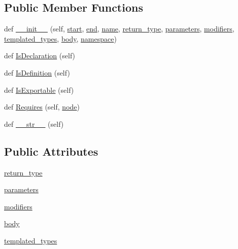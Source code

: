 \subsection*{Public Member Functions}
\begin{DoxyCompactItemize}
\item 
def \hyperlink{classcpp_1_1ast_1_1Function_ab5270f5d353ec5e9dcd136e4cc6c7f6c}{\+\_\+\+\_\+init\+\_\+\+\_\+} (self, \hyperlink{classcpp_1_1ast_1_1Node_a7b2aa97e6a049bb1a93aea48c48f1f44}{start}, \hyperlink{classcpp_1_1ast_1_1Node_a3c5e5246ccf619df28eca02e29d69647}{end}, \hyperlink{classcpp_1_1ast_1_1__GenericDeclaration_af774f4729dfd78d0538a6782fe8514c1}{name}, \hyperlink{classcpp_1_1ast_1_1Function_af750fd788d7ab33163ee066534780212}{return\+\_\+type}, \hyperlink{classcpp_1_1ast_1_1Function_a0e61ef47af9cf2fd4402dbd8cab631ef}{parameters}, \hyperlink{classcpp_1_1ast_1_1Function_ad30eed435f1ff9ff34ade9cc0d7be121}{modifiers}, \hyperlink{classcpp_1_1ast_1_1Function_a57bb03218bade3240137a0d91c467cb6}{templated\+\_\+types}, \hyperlink{classcpp_1_1ast_1_1Function_a8e25e5016b23b38e32acf2df529c0650}{body}, \hyperlink{classcpp_1_1ast_1_1__GenericDeclaration_a8aee3f11b37449d54b42a78e0a689f46}{namespace})
\item 
def \hyperlink{classcpp_1_1ast_1_1Function_ab9120d9a774eb5860d220b3bcdcaa87e}{Is\+Declaration} (self)
\item 
def \hyperlink{classcpp_1_1ast_1_1Function_ad5d96144bd8418ac72332bffb21ea86f}{Is\+Definition} (self)
\item 
def \hyperlink{classcpp_1_1ast_1_1Function_a85a073cd69116bc6191f379d69d10d72}{Is\+Exportable} (self)
\item 
def \hyperlink{classcpp_1_1ast_1_1Function_a999e7b5e43517cd4d68b1aeea8a7d6e1}{Requires} (self, \hyperlink{classnode}{node})
\item 
def \hyperlink{classcpp_1_1ast_1_1Function_aaef91d6a3b1eb2703eebb32d39c45978}{\+\_\+\+\_\+str\+\_\+\+\_\+} (self)
\end{DoxyCompactItemize}
\subsection*{Public Attributes}
\begin{DoxyCompactItemize}
\item 
\hyperlink{classcpp_1_1ast_1_1Function_af750fd788d7ab33163ee066534780212}{return\+\_\+type}
\item 
\hyperlink{classcpp_1_1ast_1_1Function_a0e61ef47af9cf2fd4402dbd8cab631ef}{parameters}
\item 
\hyperlink{classcpp_1_1ast_1_1Function_ad30eed435f1ff9ff34ade9cc0d7be121}{modifiers}
\item 
\hyperlink{classcpp_1_1ast_1_1Function_a8e25e5016b23b38e32acf2df529c0650}{body}
\item 
\hyperlink{classcpp_1_1ast_1_1Function_a57bb03218bade3240137a0d91c467cb6}{templated\+\_\+types}
\end{DoxyCompactItemize}


